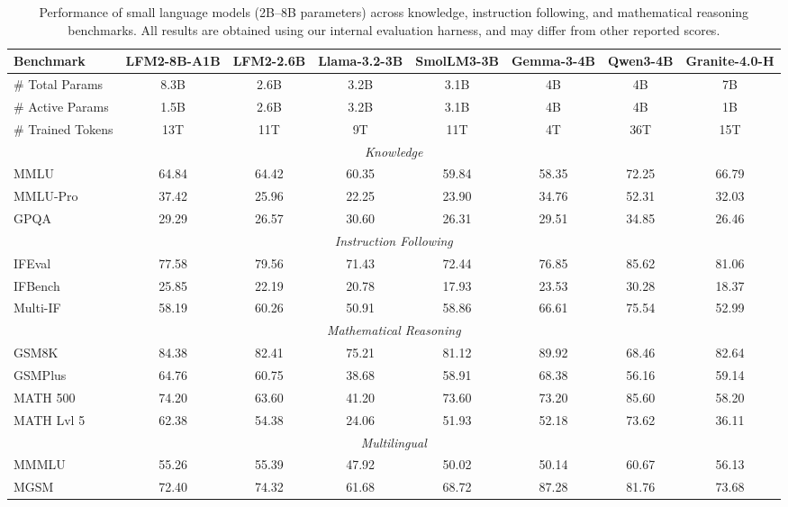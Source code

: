 \documentclass{article}
\begin{document}
\begin{table}[tb]
\centering
\small
\setlength{\tabcolsep}{4pt}
\begin{tabular}{lccccccc}
\toprule
\textbf{Benchmark} & \textbf{LFM2-8B-A1B} & \textbf{LFM2-2.6B} & \textbf{Llama-3.2-3B} & \textbf{SmolLM3-3B} & \textbf{Gemma-3-4B} & \textbf{Qwen3-4B} & \textbf{Granite-4.0-H} \\
\midrule
\# Total Params & 8.3B & 2.6B & 3.2B & 3.1B & 4B & 4B & 7B \\
\# Active Params & 1.5B & 2.6B & 3.2B & 3.1B & 4B & 4B & 1B \\
\# Trained Tokens & 13T & 11T & 9T & 11T & 4T & 36T & 15T \\
\midrule
\multicolumn{8}{c}{\textit{Knowledge}} \\
\midrule
MMLU & 64.84 & 64.42 & 60.35 & 59.84 & 58.35 & 72.25 & 66.79 \\
MMLU-Pro & 37.42 & 25.96 & 22.25 & 23.90 & 34.76 & 52.31 & 32.03 \\
GPQA & 29.29 & 26.57 & 30.60 & 26.31 & 29.51 & 34.85 & 26.46 \\
\midrule
\multicolumn{8}{c}{\textit{Instruction Following}} \\
\midrule
IFEval & 77.58 & 79.56 & 71.43 & 72.44 & 76.85 & 85.62 & 81.06 \\
IFBench & 25.85 & 22.19 & 20.78 & 17.93 & 23.53 & 30.28 & 18.37 \\
Multi-IF & 58.19 & 60.26 & 50.91 & 58.86 & 66.61 & 75.54 & 52.99 \\
\midrule
\multicolumn{8}{c}{\textit{Mathematical Reasoning}} \\
\midrule
GSM8K & 84.38 & 82.41 & 75.21 & 81.12 & 89.92 & 68.46 & 82.64 \\
GSMPlus & 64.76 & 60.75 & 38.68 & 58.91 & 68.38 & 56.16 & 59.14 \\
MATH 500 & 74.20 & 63.60 & 41.20 & 73.60 & 73.20 & 85.60 & 58.20 \\
MATH Lvl 5 & 62.38 & 54.38 & 24.06 & 51.93 & 52.18 & 73.62 & 36.11 \\
\midrule
\multicolumn{8}{c}{\textit{Multilingual}} \\
\midrule
MMMLU & 55.26 & 55.39 & 47.92 & 50.02 & 50.14 & 60.67 & 56.13 \\
MGSM & 72.40 & 74.32 & 61.68 & 68.72 & 87.28 & 81.76 & 73.68 \\
\bottomrule
\end{tabular}
\caption{Performance of small language models (2B--8B parameters) across knowledge, instruction following, and mathematical reasoning benchmarks. All results are obtained using our internal evaluation harness, and may differ from other reported scores.}
\label{tab:large_models}
\end{table}
\clearpage
\end{document}
